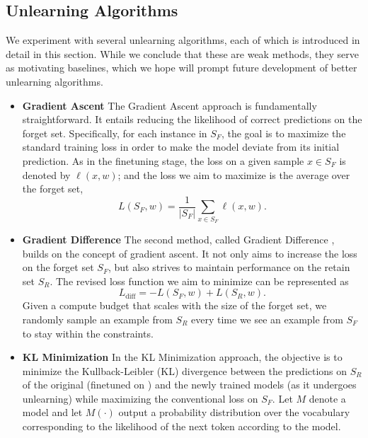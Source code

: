 

\subsection{Unlearning Algorithms}
\label{sec:unlearning-algorithms}

We experiment with several unlearning algorithms, each of which is introduced in detail in this section.
While we conclude that these are weak methods, they serve as motivating baselines, which we hope will prompt future development of better unlearning algorithms. 
\begin{itemize}
\item \textbf{Gradient Ascent}
The Gradient Ascent approach is fundamentally straightforward. 
It entails reducing the likelihood of correct predictions on the forget set. 
Specifically, for each instance in $S_F$, the goal is to maximize the standard training loss in order to make the model deviate from its initial prediction. 
As in the finetuning stage, the loss on a given sample $x \in S_F$ is denoted by $\ell(x, w)$;
and the loss we aim to maximize is the average over the forget set, 
\begin{equation}
L(S_F, w) =  \frac{1}{\vert S_F \vert} \sum_{x \in S_F}\ell(x, w). 
\end{equation}
\item \textbf{Gradient Difference} 
The second method, called Gradient Difference \citep{liu2022continual}, builds on the concept of gradient ascent. 
It not only aims to increase the loss on the forget set $S_F$, but also strives to maintain performance on the retain set $S_R$.
The revised loss function we aim to minimize can be represented as
\begin{equation}
    L_{\text{diff}} = - L(S_F, w) + L(S_R, w).
\end{equation}
Given a compute budget that scales with the size of the forget set, we randomly sample an example from $S_R$ every time we see an example from $S_F$ to stay within the constraints.
\item \textbf{KL Minimization}
In the KL Minimization approach, the objective is to minimize the Kullback-Leibler (KL) divergence between the predictions on $S_R$ of the original (finetuned on \tofu{}) and the newly trained models (as it undergoes unlearning) while maximizing the conventional loss on $S_F$. 
Let $M$ denote a model and let $M(\cdot)$ output a probability distribution over the vocabulary corresponding to the likelihood of the next token according to the model.

\end{itemize}

